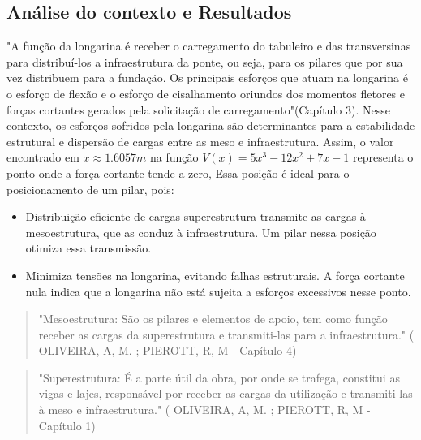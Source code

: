 \documentclass{article}
\begin{document}
\subsection*{Análise do contexto e Resultados}
"A função da longarina é receber o carregamento do tabuleiro e das transversinas para distribuí-los a infraestrutura da ponte, ou seja, para os pilares 
que por sua vez distribuem para a fundação. Os principais esforços que atuam na longarina é o esforço de flexão e o esforço de cisalhamento oriundos dos 
momentos fletores e forças cortantes gerados pela solicitação de carregamento"\cite{oliveira2016}(Capítulo 3). Nesse contexto, os esforços sofridos pela longarina são determinantes para a estabilidade estrutural e dispersão de cargas entre as meso e infraestrutura.
Assim, o valor encontrado em $x \approx 1.6057m$ na função $V(x) = 5x^3 - 12x^2 + 7x - 1$ representa o ponto onde a força cortante tende a zero, Essa posição é ideal para o posicionamento de um pilar, pois:

\begin{itemize}
\item Distribuição eficiente de cargas superestrutura transmite as cargas à mesoestrutura, que as conduz à infraestrutura. Um pilar nessa posição otimiza essa transmissão.
\item Minimiza tensões na longarina, evitando falhas estruturais. A força cortante nula indica que a longarina não está sujeita a esforços excessivos nesse ponto.
\end{itemize}


\begin{quote}
"Mesoestrutura: São os pilares e elementos de apoio, tem como função receber as cargas da superestrutura e transmiti-las para a infraestrutura." ( OLIVEIRA, A, M. ; PIEROTT, R, M - Capítulo 4) \cite{oliveira2016}   
\end{quote}

\begin{quote}
"Superestrutura: É a parte útil da obra, por onde se trafega, constitui as vigas e lajes, responsável por receber as cargas da utilização e transmiti-las à meso e infraestrutura." ( OLIVEIRA, A, M. ; PIEROTT, R, M - Capítulo 1) \cite{oliveira2016}
\end{quote}
\end{document}
